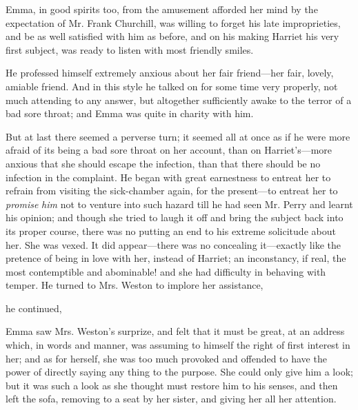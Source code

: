 Emma, in good spirits too, from the amusement afforded her mind by the expectation of Mr. Frank Churchill, was willing to forget his late improprieties, and be as well satisfied with him as before, and on his making Harriet his very first subject, was ready to listen with most friendly smiles.

He professed himself extremely anxious about her fair friend---her fair, lovely, amiable friend.  And in this style he talked on for some time very properly, not much attending to any answer, but altogether sufficiently awake to the terror of a bad sore throat; and Emma was quite in charity with him.

But at last there seemed a perverse turn; it seemed all at once as if he were more afraid of its being a bad sore throat on her account, than on Harriet's---more anxious that she should escape the infection, than that there should be no infection in the complaint. He began with great earnestness to entreat her to refrain from visiting the sick-chamber again, for the present---to entreat her to {\em promise} {\em him} not to venture into such hazard till he had seen Mr. Perry and learnt his opinion; and though she tried to laugh it off and bring the subject back into its proper course, there was no putting an end to his extreme solicitude about her. She was vexed. It did appear---there was no concealing it---exactly like the pretence of being in love with her, instead of Harriet; an inconstancy, if real, the most contemptible and abominable! and she had difficulty in behaving with temper. He turned to Mrs. Weston to implore her assistance, 

 he continued, 

Emma saw Mrs. Weston's surprize, and felt that it must be great, at an address which, in words and manner, was assuming to himself the right of first interest in her; and as for herself, she was too much provoked and offended to have the power of directly saying any thing to the purpose. She could only give him a look; but it was such a look as she thought must restore him to his senses, and then left the sofa, removing to a seat by her sister, and giving her all her attention.

